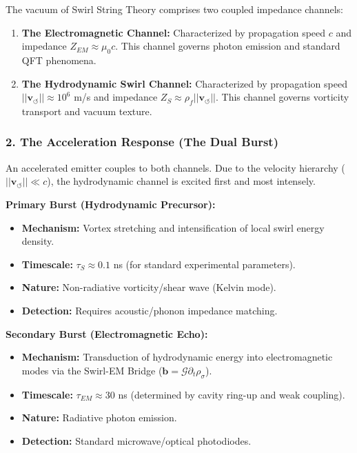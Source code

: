 \documentclass[10pt,reprint,aps,onecolumn,nofootinbib]{revtex4-2}
\begin{document}
The vacuum of Swirl String Theory comprises two coupled impedance channels:

\begin{enumerate}
\item \textbf{The Electromagnetic Channel:} Characterized by propagation speed $c$ and impedance $Z_{EM} \approx \mu_0 c$. This channel governs photon emission and standard QFT phenomena.


\item \textbf{The Hydrodynamic Swirl Channel:} Characterized by propagation speed $||\mathbf{v}_{\circlearrowleft}|| \approx 10^6$ m/s and impedance $Z_S \approx \rho_{\!f} ||\mathbf{v}_{\circlearrowleft}||$. This channel governs vorticity transport and vacuum texture.


\end{enumerate}


\subsubsection*{\textbf{2. The Acceleration Response (The Dual Burst)}}


An accelerated emitter couples to both channels. Due to the velocity hierarchy ($||\mathbf{v}_{\circlearrowleft}|| \ll c$), the hydrodynamic channel is excited first and most intensely.

\textbf{Primary Burst (Hydrodynamic Precursor):}

\begin{itemize}
\item \textbf{Mechanism:} Vortex stretching and intensification of local swirl energy density.


\item \textbf{Timescale:} $\tau_S \approx 0.1$ ns (for standard experimental parameters).


\item \textbf{Nature:} Non-radiative vorticity/shear wave (Kelvin mode).


\item \textbf{Detection:} Requires acoustic/phonon impedance matching.


\end{itemize}
\textbf{Secondary Burst (Electromagnetic Echo):}

\begin{itemize}
\item \textbf{Mechanism:} Transduction of hydrodynamic energy into electromagnetic modes via the Swirl-EM Bridge ($\mathbf{b} = \mathcal{G} \partial_t \rho_{\sigma}$).


\item \textbf{Timescale:} $\tau_{EM} \approx 30$ ns (determined by cavity ring-up and weak coupling).


\item \textbf{Nature:} Radiative photon emission.


\item \textbf{Detection:} Standard microwave/optical photodiodes.


\end{itemize}
\end{document}
